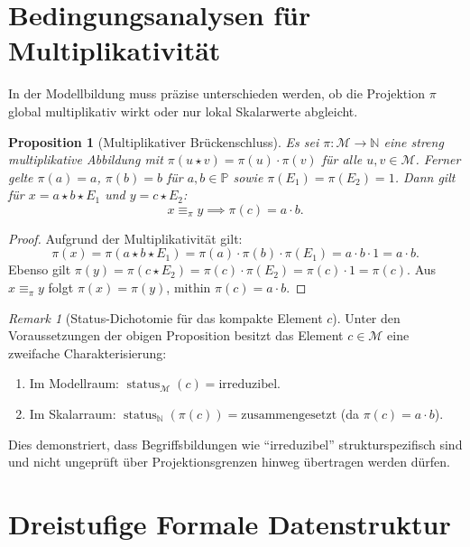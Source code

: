 \documentclass[11pt,a4paper,reqno]{amsart}
\newtheorem{proposition}[theorem]{Proposition}
\theoremstyle{definition}
\theoremstyle{remark}
\newtheorem{remark}[theorem]{Remark}
\newcommand{\M}{\mathcal{M}}
\newcommand{\N}{\mathbb{N}}
\newcommand{\Pset}{\mathbb{P}}
\newcommand{\status}{\operatorname{status}}
\begin{document}
\section{Bedingungsanalysen für Multiplikativität}

In der Modellbildung muss präzise unterschieden werden, ob die Projektion $\pi$ global multiplikativ wirkt oder nur lokal Skalarwerte abgleicht.

\begin{proposition}[Multiplikativer Brückenschluss]
Es sei $\pi: \M \to \N$ eine streng multiplikative Abbildung mit $\pi(u \star v) = \pi(u) \cdot \pi(v)$ für alle $u,v \in \M$. Ferner gelte $\pi(a) = a$, $\pi(b) = b$ für $a,b \in \Pset$ sowie $\pi(E_1) = \pi(E_2) = 1$.
Dann gilt für $x = a \star b \star E_1$ und $y = c \star E_2$:
\begin{equation}
x \equiv_\pi y \implies \pi(c) = a \cdot b.
\end{equation}
\end{proposition}

\begin{proof}
Aufgrund der Multiplikativität gilt:
\begin{equation}
\pi(x) = \pi(a \star b \star E_1) = \pi(a) \cdot \pi(b) \cdot \pi(E_1) = a \cdot b \cdot 1 = a \cdot b.
\end{equation}
Ebenso gilt $\pi(y) = \pi(c \star E_2) = \pi(c) \cdot \pi(E_2) = \pi(c) \cdot 1 = \pi(c)$.
Aus $x \equiv_\pi y$ folgt $\pi(x) = \pi(y)$, mithin $\pi(c) = a \cdot b$.
\end{proof}

\begin{remark}[Status-Dichotomie für das kompakte Element $c$]
Unter den Voraussetzungen der obigen Proposition besitzt das Element $c \in \M$ eine zweifache Charakterisierung:
\begin{enumerate}
    \item Im Modellraum: $\status_\M(c) = \text{irreduzibel}$.
    \item Im Skalarraum: $\status_\N(\pi(c)) = \text{zusammengesetzt}$ (da $\pi(c) = a \cdot b$).
\end{enumerate}
Dies demonstriert, dass Begriffsbildungen wie ``irreduzibel'' strukturspezifisch sind und nicht ungeprüft über Projektionsgrenzen hinweg übertragen werden dürfen.
\end{remark}

\section{Dreistufige Formale Datenstruktur}
\end{document}
